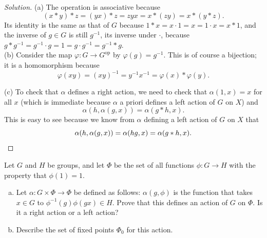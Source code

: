\documentclass[10pt]{article}
\providecommand{\ii}{\item}
\providecommand{\inv}{^{-1}}
\newenvironment{soln}{\begin{proof}[Solution]}{\end{proof}}
\begin{document}
\begin{soln}
    (a) The operation is associative because
    \begin{equation*}
	(x*y)*z = (yx)*z = zyx = x*(zy) = x*(y*z).
    \end{equation*}
    Its identity is the same as that of $G$ because
    $1*x = x\cdot1 = x = 1\cdot x = x*1$,
    and the inverse of $g\in G$ is still $g\inv$, its inverse under $\cdot$,
    because $g*g\inv = g\inv\cdot g = 1 = g\cdot g\inv = g\inv*g$.\\

    (b) Consider the map $\varphi\colon G\to G^{\text{op}}$ by
    $\varphi(g) = g\inv$. This is of course a bijection;
    it is a homomorphism because
    \begin{equation*}
        \varphi(xy) = (xy)\inv = y\inv x\inv = \varphi(x)*\varphi(y).
    \end{equation*}

    (c) To check that $\alpha$ defines a right action, we need to check
    that $\alpha(1,x) = x$ for all $x$ (which is immediate because
    $\alpha$ a priori defines a left action of $G$ on $X$) and
    \begin{equation*}
        \alpha(h,\alpha(g, x)) = \alpha(g*h, x).
    \end{equation*}
    This is easy to see because we know from $\alpha$
    defining a left action of $G$ on $X$ that
    \begin{equation*}
        \alpha(h,\alpha(g,x)) = \alpha(hg,x) = \alpha(g*h, x).\qedhere
    \end{equation*}
\end{soln}

\pagebreak

\begin{problem}
    Let $G$ and $H$ be groups, and let $\Phi$ be
    the set of all functions $\phi\colon G\to H$
    with the property that $\phi(1) = 1$.
    \begin{enumerate}[(a)]
        \ii Let $\alpha\colon G\times\Phi\to\Phi$ be defined as follows:
	$\alpha(g,\phi)$ is the function that takes $x\in G$ to
	$\phi\inv(g)\phi(gx)\in H$. Prove that this defines an action
	of $G$ on $\Phi$. Is it a right action or a left action?
	\ii Describe the set of fixed points $\Phi_0$ for this action.
    \end{enumerate}
\end{problem}
\end{document}
